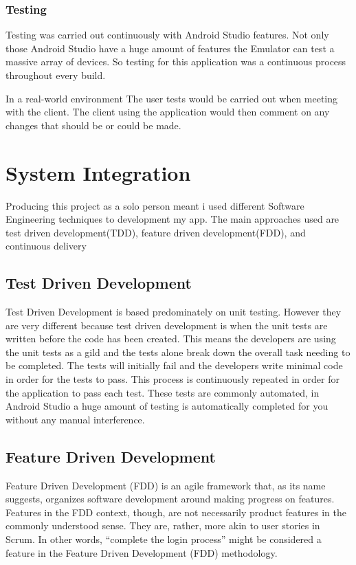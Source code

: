 \subsubsection{Testing}
Testing was carried out continuously with Android Studio features. Not only those Android Studio have a huge amount of features the Emulator can test a massive array of devices. So testing for this application was a continuous process throughout every build.

In a real-world environment The user tests would be carried out when meeting with the client. The client using the application would then comment on any changes that should be or could be made.

\section{System Integration}
Producing this project as a solo person meant i used different Software Engineering techniques to development my app. The main approaches used are test driven development(TDD), feature driven development(FDD), and continuous delivery 

\subsection{Test Driven Development}
Test Driven Development is based predominately on unit testing. However they are very different because test driven development is when the unit tests are written before the code has been created. This means the developers are using the unit tests as a gild and the tests alone break down the overall task needing to be completed. The tests will initially fail and the developers write minimal code in order for the tests to pass. This process is continuously repeated in order for the application to pass each test. These tests are commonly automated, in Android Studio a huge amount of testing is automatically completed for you without any manual interference.

\subsection{Feature Driven Development}
Feature Driven Development (FDD) is an agile framework that, as its name suggests, organizes software development around making progress on features. Features in the FDD context, though, are not necessarily product features in the commonly understood sense. They are, rather, more akin to user stories in Scrum. In other words, “complete the login process” might be considered a feature in the Feature Driven Development (FDD) methodology.\cite{FDD}

